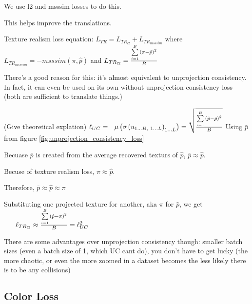 \documentclass{article}
\begin{document}
We use l2 and msssim losses to do this.

This helps improve the translations.

Texture realism loss equation:
$L_{TR}=L_{TR_{l2}}+L_{TR_{msssim}}$
where 
$L_{TR_{msssim}} = -msssim(\pi,\hat{p})$ and
$L_{TR_{l2}} = \frac{
	\sum\limits_{i=1}^B {
	   \left( \pi-\hat{p}  \right)^2
		} 
   }
   {B}$

There's a good reason for this: it's almost equivalent to unprojection consistency.
In fact, it can even be used on its own without unprojection consistency loss (both are sufficient to translate things.)

(Give theoretical explation)
$
\ell_{UC} = 
\
\
\mu\left(\sigma\left(u_{1\dots B,\ 1\dots L}\right)_{1 \dots L}\right) = 
\sqrt{
\frac{
	 \sum\limits_{i=1}^B {
		\left( \hat{p}-\bar{p}  \right)^2
		 } 
	}
	{B}
}
$
Using $\bar{p}$ from figure \ref{fig:unprojection_consistency_loss}

Becuase $\bar{p}$ is created from the average recovered texturs of $\hat{p}$, $\bar{p} \approx \hat{p}$.

Becuse of texture realism loss, $\pi \approx \hat{p}$.

Therefore, $\bar{p} \approx \hat{p} \approx \pi$



Substituting one projected texture for another, aka $\pi$ for $\bar{p}$, we get 
$ \
\
\
\
\ \ell_{TR_{l2}}
\approx
\frac{\sum\limits_{i=1}^B {
	\left( \hat{p}-\pi  \right)^2
	 }}{B} = \ell_{UC}^2
$



There are some advantages over unprojection consistency though: 
smaller batch sizes (even a batch size of 1, which UC cant do),
you don't have to get lucky (the more chaotic, or even the more zoomed in a dataset becomes the less likely there is to be any collisions)






\subsection{Color Loss}
\end{document}
